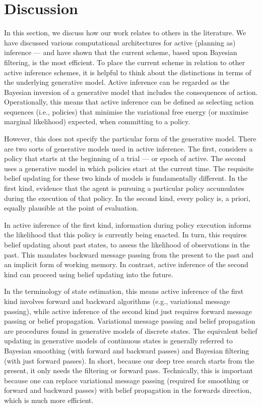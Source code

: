 \documentclass[twoside,11pt]{article}
\begin{document}
\section{Discussion} \label{sec:discussion}

In this section, we discuss how our work relates to others in the literature. We have discussed various computational architectures for active (planning as) inference --- and have shown that the current scheme, based upon Bayesian filtering, is the most efficient. To place the current scheme in relation to other active inference schemes, it is helpful to think about the distinctions in terms of the underlying generative model. Active inference can be regarded as the Bayesian inversion of a generative model that includes the consequences of action. Operationally, this means that active inference can be defined as selecting action sequences (i.e., policies) that minimise the variational free energy (or maximise marginal likelihood) expected, when committing to a policy.

However, this does not specify the particular form of the generative model. There are two sorts of generative models used in active inference. The first, considers a policy that starts at the beginning of a trial --- or epoch of active. The second uses a generative model in which policies start at the current time. The requisite belief updating for these two kinds of models is fundamentally different. In the first kind, evidence that the agent is pursuing a particular policy accumulates during the execution of that policy. In the second kind, every policy is, a priori, equally plausible at the point of evaluation.

In active inference of the first kind, information during policy execution informs the likelihood that this policy is currently being enacted. In turn, this requires belief updating about past states, to assess the likelihood of observations in the past. This mandates backward message passing from the present to the past and an implicit form of working memory. In contrast, active inference of the second kind can proceed using belief updating into the future.

In the terminology of state estimation, this means active inference of the first kind involves forward and backward algorithms (e.g., variational message passing), while active inference of the second kind just requires forward message passing or belief propagation. Variational message passing and belief propagation are procedures found in generative models of discrete states. The equivalent belief updating in generative models of continuous states is generally referred to Bayesian smoothing (with forward and backward passes) and Bayesian filtering (with just forward passes). In short, because our deep tree search starts from the present, it only needs the filtering or forward pass. Technically, this is important because one can replace variational message passing (required for smoothing or forward and backward passes) with belief propagation in the forwards direction, which is much more efficient.
\end{document}
